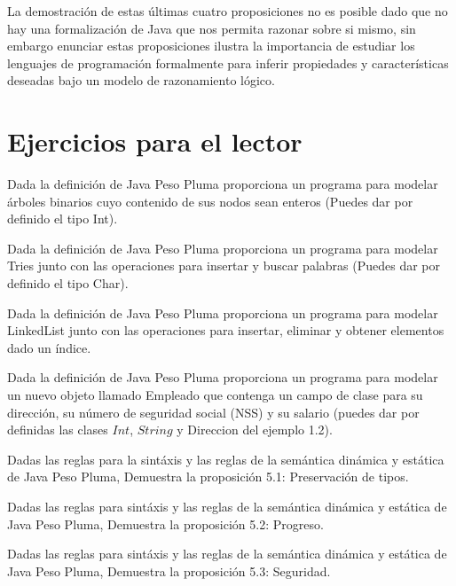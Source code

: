 La demostración de estas últimas cuatro proposiciones no es posible dado que no hay una formalización de \textsf{Java} que nos permita razonar sobre si mismo, sin embargo enunciar estas proposiciones ilustra la importancia de estudiar los lenguajes de programación formalmente para inferir propiedades y características deseadas bajo un modelo de razonamiento lógico.


\section{Ejercicios para el lector}

\begin{exercise}
    Dada la definición de \textsf{Java Peso Pluma} proporciona un programa para modelar árboles binarios cuyo contenido de sus nodos sean enteros (Puedes dar por definido el tipo \textsf{Int}).
\end{exercise}

\bigskip


\begin{exercise}
    Dada la definición de \textsf{Java Peso Pluma} proporciona un programa para modelar Tries junto con las operaciones para insertar y buscar palabras (Puedes dar por definido el tipo \textsf{Char}).
\end{exercise}

\bigskip

\begin{exercise}
    Dada la definición de \textsf{Java Peso Pluma} proporciona un programa para modelar LinkedList junto con las operaciones para insertar, eliminar y obtener elementos dado un índice.
\end{exercise}

\bigskip

\begin{exercise}
    Dada la definición de \textsf{Java Peso Pluma} proporciona un programa para modelar un nuevo objeto llamado \textsf{Empleado} que contenga un campo de clase para su dirección, su número de seguridad social (NSS) y su salario (puedes dar por definidas las clases $Int$, $String$ y \textsf{Direccion} del ejemplo 1.2).
\end{exercise}

\bigskip

\begin{exercise}
    Dadas las reglas para la sintáxis y las reglas de la semántica dinámica y estática de \textsf{Java Peso Pluma}, Demuestra la proposición 5.1: Preservación de tipos.
\end{exercise}

\bigskip

\begin{exercise}
   Dadas las reglas para sintáxis y las reglas de la semántica dinámica y estática de \textsf{Java Peso Pluma}, Demuestra la proposición 5.2: Progreso.
\end{exercise}

\bigskip

\begin{exercise}
   Dadas las reglas para sintáxis y las reglas de la semántica dinámica y estática de \textsf{Java Peso Pluma}, Demuestra la proposición 5.3: Seguridad.
\end{exercise}